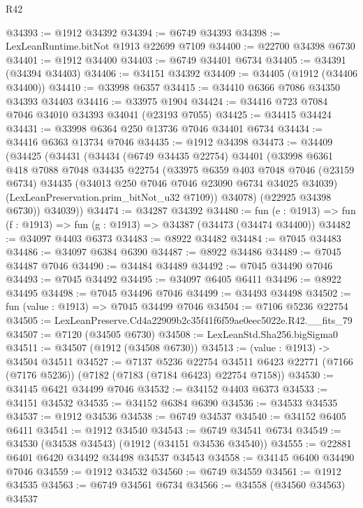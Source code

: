 \begin{lexlean}{R42}
\begin{coremodule}
{@34393 := @1912 @34392
@34394 := @6749 @34393
@34398 := LexLeanRuntime.bitNot @1913 @22699 @7109
@34400 := @22700 @34398 @6730
@34401 := @1912 @34400
@34403 := @6749 @34401 @6734
@34405 := @34391 (@34394 @34403)
@34406 := @34151 @34392
@34409 := @34405 (@1912 (@34406 @34400))
@34410 := @33998 @6357
@34415 := @34410 @6366 @7086 @34350 @34393 @34403
@34416 := @33975 @1904
@34424 := @34416 @723 @7084 @7046 @34010 @34393 @34041 (@23193 @7055)
@34425 := @34415 @34424
@34431 := @33998 @6364 @250 @13736 @7046 @34401 @6734
@34434 := @34416 @6363 @13734 @7046
@34435 := @1912 @34398
@34473 := @34409
    (@34425
      (@34431
        (@34434
          (@6749 @34435 @22754)
          @34401
          (@33998
            @6361
            @418
            @7088
            @7048
            @34435
            @22754
            (@33975
              @6359
              @403
              @7048
              @7046
              (@23159 @6734)
              @34435
              (@34013 @250 @7046 @7046 @23090 @6734 @34025 @34039)
              (LexLeanPreservation.prim_bitNot_u32 @7109))
            @34078)
          (@22925 @34398 @6730))
        @34039))
@34474 := @34287 @34392
@34480 := fun (e : @1913) => fun (f : @1913) => fun (g : @1913) => @34387 (@34473 (@34474 @34400))
@34482 := @34097 @4403 @6373
@34483 := @8922 @34482
@34484 := @7045 @34483
@34486 := @34097 @6384 @6390
@34487 := @8922 @34486
@34489 := @7045 @34487 @7046
@34490 := @34484 @34489
@34492 := @7045 @34490 @7046
@34493 := @7045 @34492
@34495 := @34097 @6405 @6411
@34496 := @8922 @34495
@34498 := @7045 @34496 @7046
@34499 := @34493 @34498
@34502 := fun (value : @1913) => @7045 @34499 @7046
@34504 := @7106 @5236 @22754
@34505 := LexLeanPreserve.Cd4a22909b2c35f41f6f59ae0eec5022e.R42.__fits_79
@34507 := @7120 (@34505 @6730)
@34508 := LexLeanStd.Sha256.bigSigma0
@34511 := @34507 (@1912 (@34508 @6730))
@34513 := (value : @1913) -> @34504 @34511
@34527 := @7137
    @5236
    @22754
    @34511
    @6423
    @22771
    (@7166 (@7176 @5236))
    (@7182 (@7183 (@7184 @6423) @22754 @7158))
@34530 := @34145 @6421 @34499 @7046
@34532 := @34152 @4403 @6373
@34533 := @34151 @34532
@34535 := @34152 @6384 @6390
@34536 := @34533 @34535
@34537 := @1912 @34536
@34538 := @6749 @34537
@34540 := @34152 @6405 @6411
@34541 := @1912 @34540
@34543 := @6749 @34541 @6734
@34549 := @34530 (@34538 @34543) (@1912 (@34151 @34536 @34540))
@34555 := @22881 @6401 @6420 @34492 @34498 @34537 @34543
@34558 := @34145 @6400 @34490 @7046
@34559 := @1912 @34532
@34560 := @6749 @34559
@34561 := @1912 @34535
@34563 := @6749 @34561 @6734
@34566 := @34558 (@34560 @34563) @34537
}
\end{coremodule}
\end{lexlean}
